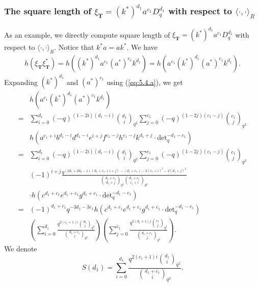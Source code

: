 \documentclass[table,a4paper,reqno]{amsart}
\numberwithin{equation}{section}
\theoremstyle{definition}
\begin{document}
\subsubsection{The square length of $\xi_\mathbf{T}=(k^*)^{d_1}a^{c_1}D_q^{d_1}$ with respect to $\langle\cdot,\cdot\rangle_R$}
As an example, we directly compute square length of $\xi_\mathbf{T}=(k^*)^{d_1}a^{c_1}D_q^{d_1}$ with respect to $\langle\cdot,\cdot\rangle_R$. Notice that $k^*a=ak^*$. We have
\begin{equation}
    \begin{split}
        h(\xi_\textbf{T}\xi_\textbf{T}^*)=h((k^*)^{d_1}a^{c_1}(a^*)^{c_1}k^{d_1})=h(a^{c_1}(k^*)^{d_1}(a^*)^{c_1}k^{d_1}).
    \end{split}
\end{equation}
Expanding $(k^*)^{d_1}$ and $(a^*)^{c_1}$ using (\ref{eq:5.4.a}), we get 
\begin{equation}\label{eq:5.19}
    \begin{split}
        &h(a^{c_1}(k^*)^{d_1}(a^*)^{c_1}k^{d_1})\\
        =&\sum_{i=0}^{d_1}(-q)^{(1-2i)(d_1-i)}{d_1\choose i}_{q^2}\sum_{j=0}^{c_1}(-q)^{(1-2j)(c_1-j)}{c_1\choose j}_{q^2}\\
        &h(a^{c_1+i}b^{d_1-i}d^{d_1-i}e^{i+j}f^{c_1-j}h^{c_1-j}k^{d_1+j}\cdot\text{det}_q^{-d_1-c_1})\\
        =&\sum_{i=0}^{d_1}(-q)^{(1-2i)(d_1-i)}{d_1\choose i}_{q^2}\sum_{j=0}^{c_1}(-q)^{(1-2j)(c_1-j)}{c_1\choose j}_{q^2}\\
        &(-1)^{i+j}\frac{q^{(2d_1+2d_2-1)(d_1+c_1+i+j)-(d_1+c_1)-2(c_1+i)^2-2(d_1+j)^2}}{{d_1+c_1\choose d_1+j}_{q^2}{d_1+c_1\choose c_1+i}_{q^2}}\\
        &\cdot h\left(c^{d_1+c_1}e^{d_1+c_1}g^{d_1+c_1}\cdot\text{det}_q^{-d_1-c_1}\right)\\
        =&(-1)^{d_1+c_1}q^{-3d_1-3c_1}h\left(c^{d_1+c_1}e^{d_1+c_1}g^{d_1+c_1}\cdot\text{det}_q^{-d_1-c_1}\right)\\
        &\left(\sum_{i=0}^{d_1}\frac{q^{2(c_1+1)i}{d_1\choose i}_{q^2}}{{d_1+c_1\choose i}_{q^2}}\right)\left(\sum_{j=0}^{c_1}\frac{q^{2(d_1+1)j}{c_1\choose j}_{q^2}}{{d_1+c_1\choose j}_{q^2}}\right).
    \end{split}
\end{equation}
We denote
\begin{equation}\label{eq:5.20}
    S(d_1)=\sum_{i=0}^{d_1}\frac{q^{2(c_1+1)i}{d_1\choose i}_{q^2}}{{d_1+c_1\choose i}_{q^2}}.
\end{equation}
\end{document}
